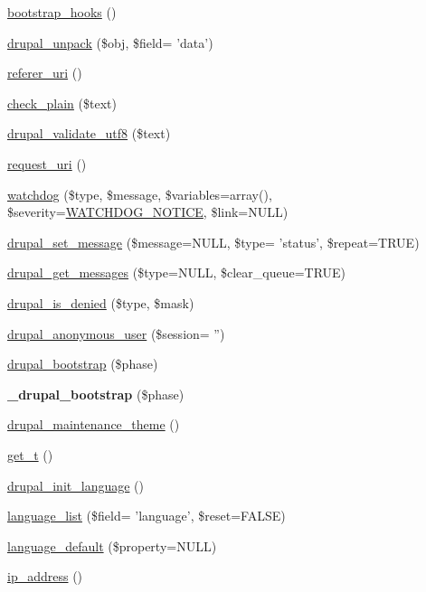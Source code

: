 \begin{CompactItemize}
\item 
\hyperlink{bootstrap_8inc_7a24c0b200b76c22c63b99e935e1bd5a}{bootstrap\_\-hooks} ()
\item 
\hyperlink{bootstrap_8inc_4ca39fd7bed1a45e340f86bc2d59224d}{drupal\_\-unpack} (\$obj, \$field= 'data')
\item 
\hyperlink{bootstrap_8inc_fbe92bfb1695e3710ae4136c6972be5c}{referer\_\-uri} ()
\item 
\hyperlink{bootstrap_8inc_76fc67a30fd8d75ddd80565e6e65a13d}{check\_\-plain} (\$text)
\item 
\hyperlink{bootstrap_8inc_bf62947a33393477301b0070b1ff0c7a}{drupal\_\-validate\_\-utf8} (\$text)
\item 
\hyperlink{bootstrap_8inc_80b52d5331d840440b5e3dfe82dd7ea2}{request\_\-uri} ()
\item 
\hyperlink{bootstrap_8inc_cb7338e6740302727043d64e3ae1257b}{watchdog} (\$type, \$message, \$variables=array(), \$severity=\hyperlink{bootstrap_8inc_757a33416683e8c44636a8799f60b477}{WATCHDOG\_\-NOTICE}, \$link=NULL)
\item 
\hyperlink{bootstrap_8inc_d9223d86c7b08b1288274ce211d9bfa6}{drupal\_\-set\_\-message} (\$message=NULL, \$type= 'status', \$repeat=TRUE)
\item 
\hyperlink{bootstrap_8inc_2c9915d030bad8c5bacf6de25e6fd14c}{drupal\_\-get\_\-messages} (\$type=NULL, \$clear\_\-queue=TRUE)
\item 
\hyperlink{bootstrap_8inc_81a621ba76a61bc21124da331cc7e4af}{drupal\_\-is\_\-denied} (\$type, \$mask)
\item 
\hyperlink{bootstrap_8inc_e529fccbab60752dd4f91acc6b7fce06}{drupal\_\-anonymous\_\-user} (\$session= '')
\item 
\hyperlink{bootstrap_8inc_878e64af36fcd5f173b07ae57b07ea10}{drupal\_\-bootstrap} (\$phase)
\item 
\hypertarget{bootstrap_8inc_5b8c2006a61d66b1b2f4180e0fb62b06}{
\textbf{\_\-drupal\_\-bootstrap} (\$phase)}
\label{bootstrap_8inc_5b8c2006a61d66b1b2f4180e0fb62b06}

\item 
\hyperlink{bootstrap_8inc_861d3f7c553fe62829f6c0f2e4fe89e6}{drupal\_\-maintenance\_\-theme} ()
\item 
\hyperlink{bootstrap_8inc_a50232f577883a48731fc93530628a79}{get\_\-t} ()
\item 
\hyperlink{bootstrap_8inc_5f67d97a363fcc3f51bf6a7b135778e7}{drupal\_\-init\_\-language} ()
\item 
\hyperlink{bootstrap_8inc_0811ad6f8df4a2f64457914aeafcee3d}{language\_\-list} (\$field= 'language', \$reset=FALSE)
\item 
\hyperlink{bootstrap_8inc_336c0878074791056c62640cd95d8067}{language\_\-default} (\$property=NULL)
\item 
\hyperlink{bootstrap_8inc_ec2f772317b4fb79cc696412c2e455c3}{ip\_\-address} ()
\end{CompactItemize}


